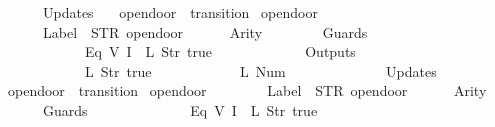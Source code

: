 \begin{isabellebody}
\ \ \ \ \ \ Updates\ {\isacharequal}\ {\isacharbrackleft}{\isacharbrackright}\isanewline
{\isasymrparr}{\isachardoublequoteclose}\isanewline
\isanewline
{}\isamarkupfalse%
\ {\isachardoublequoteopen}opendoor{}{\isachardoublequoteclose}\ {\isacharcolon}{\isacharcolon}\ {\isachardoublequoteopen}transition{\isachardoublequoteclose}\ \isanewline
{\isachardoublequoteopen}opendoor{}\ {\isasymequiv}\ {\isasymlparr}\isanewline
\ \ \ \ \ \ Label\ {\isacharequal}\ STR\ {\isacharprime}{\isacharprime}opendoor{\isacharprime}{\isacharprime}{\isacharcomma}\isanewline
\ \ \ \ \ \ Arity\ {\isacharequal}\ {}{\isacharcomma}\isanewline
\ \ \ \ \ \ Guards\ {\isacharequal}\ {\isacharbrackleft}\isanewline
\ \ \ \ \ \ \ \ \ \ \ \ {\isacharparenleft}Eq\ {\isacharparenleft}V\ {\isacharparenleft}I\ {}{\isacharparenright}{\isacharparenright}\ {\isacharparenleft}L\ {\isacharparenleft}Str\ {\isacharprime}{\isacharprime}true{\isacharprime}{\isacharprime}{\isacharparenright}{\isacharparenright}{\isacharparenright}\isanewline
\ \ \ \ \ \ {\isacharbrackright}{\isacharcomma}\isanewline
\ \ \ \ \ \ Outputs\ {\isacharequal}\ {\isacharbrackleft}\isanewline
\ \ \ \ \ \ \ \ \ \ \ \ {\isacharparenleft}L\ {\isacharparenleft}Str\ {\isacharprime}{\isacharprime}true{\isacharprime}{\isacharprime}{\isacharparenright}{\isacharparenright}{\isacharcomma}\isanewline
\ \ \ \ \ \ \ \ \ \ \ \ {\isacharparenleft}L\ {\isacharparenleft}Num\ {}{\isacharparenright}{\isacharparenright}\isanewline
\ \ \ \ \ \ {\isacharbrackright}{\isacharcomma}\isanewline
\ \ \ \ \ \ Updates\ {\isacharequal}\ {\isacharbrackleft}{\isacharbrackright}\isanewline
{\isasymrparr}{\isachardoublequoteclose}\isanewline
\isanewline
{}\isamarkupfalse%
\ {\isachardoublequoteopen}opendoor{}{\isachardoublequoteclose}\ {\isacharcolon}{\isacharcolon}\ {\isachardoublequoteopen}transition{\isachardoublequoteclose}\ \isanewline
{\isachardoublequoteopen}opendoor{}\ {\isasymequiv}\ {\isasymlparr}\isanewline
\ \ \ \ \ \ Label\ {\isacharequal}\ STR\ {\isacharprime}{\isacharprime}opendoor{\isacharprime}{\isacharprime}{\isacharcomma}\isanewline
\ \ \ \ \ \ Arity\ {\isacharequal}\ {}{\isacharcomma}\isanewline
\ \ \ \ \ \ Guards\ {\isacharequal}\ {\isacharbrackleft}\isanewline
\ \ \ \ \ \ \ \ \ \ \ \ {\isacharparenleft}Eq\ {\isacharparenleft}V\ {\isacharparenleft}I\ {}{\isacharparenright}{\isacharparenright}\ {\isacharparenleft}L\ {\isacharparenleft}Str\ {\isacharprime}{\isacharprime}true{\isacharprime}{\isacharprime}{\isacharparenright}{\isacharparenright}{\isacharparenright}\isanewline

\end{isabellebody}
